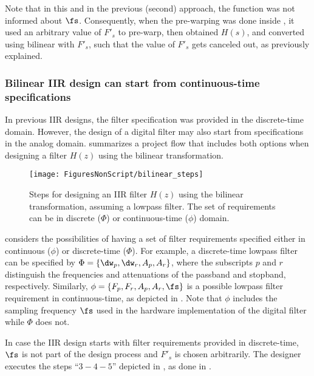 Note that in this and in the previous (second) approach, the function  was not informed
about $\fs$. Consequently, when the pre-warping was done inside , it used
an arbitrary value of $F'_s$ to pre-warp, then obtained $H(s)$, and converted using bilinear with $F'_s$, such that the value of $F'_s$ gets canceled out, as previously explained.
\eExample

\subsubsection{Bilinear IIR design can start from continuous-time specifications}

In previous IIR designs, the filter specification was provided in the discrete-time domain.
However, the design of a digital filter may also start from specifications in the analog domain.
 summarizes a project flow that
includes both options when designing a filter $H(z)$ using the bilinear transformation.


\begin{figure}
\centering
\texttt{[image: FiguresNonScript/bilinear\_steps]}
\caption{Steps for designing an IIR filter $H(z)$ using the bilinear transformation, assuming a lowpass filter. 
The set of requirements can be in discrete ($\Phi$) or continuous-time ($\phi$) domain.\label{fig:bilinear_steps}}
\end{figure}

 considers the possibilities of having a set of
filter requirements specified either in continuous ($\phi$) or discrete-time ($\Phi$). 
For example, a discrete-time lowpass filter
can be specified by $\Phi=\{\dw_p,\dw_r,A_p,A_r\}$, where the subscripts $p$ and $r$
distinguish the frequencies and attenuations of the passband and stopband, respectively.
Similarly, $\phi=\{F_p,F_r,A_p,A_r,\fs\}$ is a possible lowpass filter requirement in 
continuous-time, as depicted in . 
Note that $\phi$ includes the sampling frequency $\fs$ used in the hardware implementation 
of the digital filter while $\Phi$ does not.

In case the IIR design starts with filter requirements
provided in discrete-time, $\fs$ is not part of the design process and $F'_s$ is chosen arbitrarily.
The designer executes the steps ``$3-4-5$'' depicted in ,
as done in .


